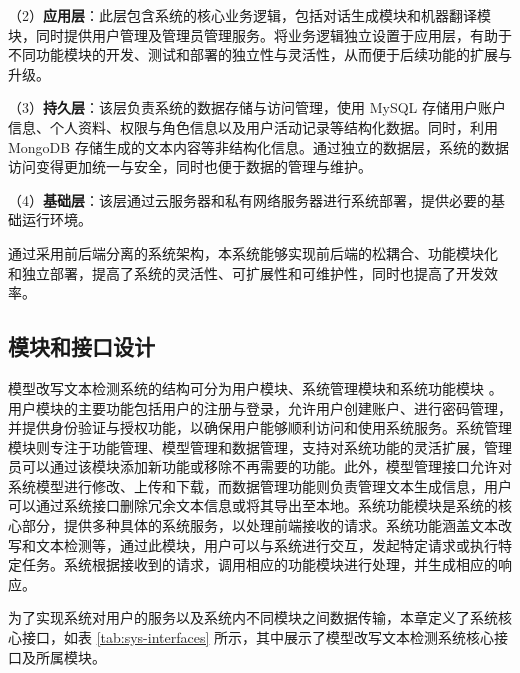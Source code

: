 （2）\textbf{应用层}：此层包含系统的核心业务逻辑，包括对话生成模块和机器翻译模块，同时提供用户管理及管理员管理服务。将业务逻辑独立设置于应用层，有助于不同功能模块的开发、测试和部署的独立性与灵活性，从而便于后续功能的扩展与升级。

（3）\textbf{持久层}：该层负责系统的数据存储与访问管理，使用 MySQL 存储用户账户信息、个人资料、权限与角色信息以及用户活动记录等结构化数据。同时，利用 MongoDB 存储生成的文本内容等非结构化信息。通过独立的数据层，系统的数据访问变得更加统一与安全，同时也便于数据的管理与维护。

（4）\textbf{基础层}：该层通过云服务器和私有网络服务器进行系统部署，提供必要的基础运行环境。

通过采用前后端分离的系统架构，本系统能够实现前后端的松耦合、功能模块化
和独立部署，提高了系统的灵活性、可扩展性和可维护性，同时也提高了开发效率。

\subsection{模块和接口设计}
\label{sec:sys-module}

模型改写文本检测系统的结构可分为用户模块、系统管理模块和系统功能模块
。用户模块的主要功能包括用户的注册与登录，允许用户创建账户、进行密码管理，并提供身份验证与授权功能，以确保用户能够顺利访问和使用系统服务。系统管理模块则专注于功能管理、模型管理和数据管理，支持对系统功能的灵活扩展，管理员可以通过该模块添加新功能或移除不再需要的功能。此外，模型管理接口允许对系统模型进行修改、上传和下载，而数据管理功能则负责管理文本生成信息，用户可以通过系统接口删除冗余文本信息或将其导出至本地。系统功能模块是系统的核心部分，提供多种具体的系统服务，以处理前端接收的请求。系统功能涵盖文本改写和文本检测等，通过此模块，用户可以与系统进行交互，发起特定请求或执行特定任务。系统根据接收到的请求，调用相应的功能模块进行处理，并生成相应的响应。


为了实现系统对用户的服务以及系统内不同模块之间数据传输，本章定义了系统核心接口，如表 \ref{tab:sys-interfaces} 所示，其中展示了模型改写文本检测系统核心接口及所属模块。

